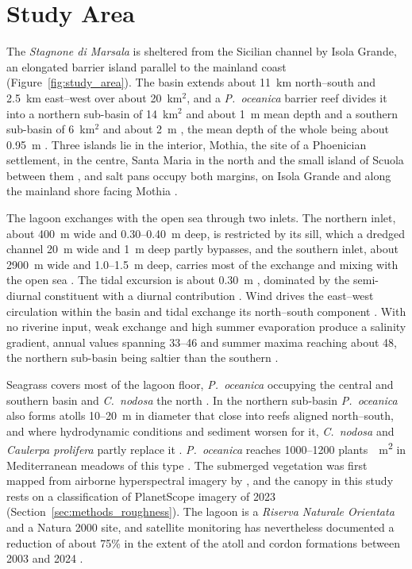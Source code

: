 \section{Study Area}
\label{sec:study_area}

The \emph{Stagnone di Marsala} is sheltered from the Sicilian channel by Isola
Grande, an elongated barrier island parallel to the mainland coast
(Figure~\ref{fig:study_area}). The basin extends about 11~km north--south and
2.5~km east--west \citep{DeMarchis2012} over about 20~km$^2$, and a
\emph{P.\ oceanica} barrier reef divides it into a northern sub-basin of
14~km$^2$ and about 1~m mean depth and a southern sub-basin of 6~km$^2$ and
about 2~m \citep{LaLoggia2004}, the mean depth of the whole being about 0.95~m
\citep{CiraoloDeMarchis2009}. Three islands lie in the interior, Mothia, the
site of a Phoenician settlement, in the centre, Santa Maria in the north
\citep{CiraoloDeMarchis2009} and the small island of Scuola between them
\citep{DeMarchis2012}, and salt pans occupy both margins, on Isola
Grande and along the mainland shore facing Mothia \citep{Basso2008}.

The lagoon exchanges with the open sea through two inlets. The northern inlet,
about 400~m wide and 0.30--0.40~m deep, is restricted by its sill, which a
dredged channel 20~m wide and 1~m deep partly bypasses, and the southern inlet,
about 2900~m wide and 1.0--1.5~m deep, carries most of the exchange and mixing
with the open sea \citep{CiraoloDeMarchis2009}. The tidal excursion is about 0.30~m \citep{LaLoggia2004}, dominated by the
semi-diurnal constituent with a diurnal contribution \citep{DeMarchis2012}. Wind drives the east--west circulation within the basin
and tidal exchange its north--south component \citep{CiraoloDeMarchis2009,
DeMarchis2012}. With no riverine input, weak exchange and high summer
evaporation produce a salinity gradient, annual values spanning 33--46
\citep{Basso2008} and summer maxima reaching about 48, the northern sub-basin
being saltier than the southern \citep{Mancuso2023}.

Seagrass covers most of the lagoon floor, \emph{P.\ oceanica} occupying the
central and southern basin and \emph{C.\ nodosa} the north
\citep{CiraoloDeMarchis2009}. In the northern sub-basin \emph{P.\ oceanica}
also forms atolls 10--20~m in diameter that close into reefs aligned
north--south, and where hydrodynamic conditions and sediment worsen for it,
\emph{C.\ nodosa} and \emph{Caulerpa prolifera} partly replace it
\citep{LaLoggia2004}. \emph{P.\ oceanica}
reaches 1000--1200 plants~\si{\per\metre\squared} in Mediterranean meadows of
this type \citep{Ciraolo2009a}. The submerged vegetation was first mapped from
airborne hyperspectral imagery by \citet{CiraoloMaltese2006}, and the canopy
in this study rests on a classification of PlanetScope imagery of 2023
(Section~\ref{sec:methods_roughness}). The lagoon is a \emph{Riserva Naturale
Orientata} and a Natura 2000 site, and satellite monitoring has nevertheless
documented a reduction of about 75\% in the extent of the atoll and cordon
formations between 2003 and 2024 \citep{Maltese2025}.


